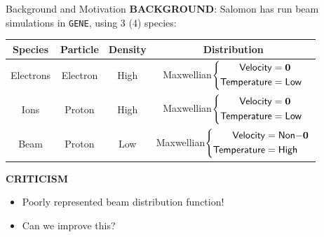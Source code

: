     \begin{frame}{Background and Motivation}
        \vspace{0.5mm}
        {\bf BACKGROUND}: Salomon has run beam simulations in {\tt GENE}, using 3 (4) species:
        \vspace{0.5mm}
        {\footnotesize \begin{center}\begin{tabular}{ c || c | c | c }
            Species  &  Particle  &  Density  &  Distribution  \\
            \hline\hline
            Electrons  &  Electron  &  High  &  Maxwellian$\left\{\begin{aligned}  {\sf Velocity}  &=  \mathbf{0} 
    \\  {\sf Temperature}  &=  {\sf Low}  \end{aligned}\right.$  \\
            \hline
            Ions  &  Proton  &  High  &  Maxwellian$\left\{\begin{aligned}  {\sf Velocity}  &=  \mathbf{0} 
    \\  {\sf Temperature}  &=  {\sf Low}  \end{aligned}\right.$  \\
            \hline
            Beam  &  Proton  &  Low  &  {\color{red!90} Maxwellian$\left\{\begin{aligned}  {\sf Velocity}  &=  {\sf Non-}\mathbf{0}
    \\  {\sf Temperature}  &=  {\sf High}  \end{aligned}\right.$}
        \end{tabular}\end{center}}
        
        \begin{alertblock}{\bf CRITICISM}
            \begin{itemize}
                \item  Poorly represented beam distribution function!

                \item  Can we improve this?
            \end{itemize}
        \end{alertblock}
    \end{frame}
    
